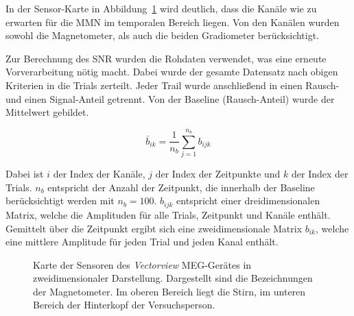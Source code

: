 \documentclass[doc,a4paper,12pt]{apa6}
\begin{document}
In der Sensor-Karte in Abbildung~\ref{img:sensmap} wird deutlich, dass die Kanäle wie zu erwarten für die MMN im temporalen Bereich liegen. Von den Kanälen wurden sowohl die Magnetometer, als auch die beiden Gradiometer berücksichtigt.

Zur Berechnung des SNR wurden die Rohdaten verwendet, was eine erneute Vorverarbeitung nötig macht. Dabei wurde der gesamte Datensatz nach obigen Kriterien in die Trials zerteilt. Jeder Trail wurde anschließend in einen Rausch- und einen Signal-Anteil getrennt. Von der Baseline (Rausch-Anteil) wurde der Mittelwert gebildet.

\begin{equation}
\bar{b}_{ik} = \frac{1}{n_b} \sum_{j=1}^{n_b} b_{ijk}
\end{equation}

Dabei ist $i$ der Index der Kanäle, $j$ der Index der Zeitpunkte und $k$ der Index der Trials. $n_b$ entspricht der Anzahl der Zeitpunkt, die innerhalb der Baseline berücksichtigt werden mit $n_b = 100$. $b_{ijk}$ entspricht einer dreidimensionalen Matrix, welche die Amplituden für alle Trials, Zeitpunkt und Kanäle enthält. Gemittelt über die Zeitpunkt ergibt sich eine zweidimensionale Matrix $b_{ik}$, welche eine mittlere Amplitude für jeden Trial und jeden Kanal enthält.

\begin{figure}
  \centering
  \setlength{\fboxsep}{5mm}
  \vspace*{3mm}
  \caption[Karte der Sensoren des \emph{Vectorview} MEG-Gerätes]{Karte der Sensoren des \emph{Vectorview} MEG-Gerätes in zweidimensionaler Darstellung. Dargestellt sind die Bezeichnungen der Magnetometer. Im oberen Bereich liegt die Stirn, im unteren Bereich der Hinterkopf der Versuchsperson.}
  \label{img:sensmap}
\end{figure}
\end{document}
